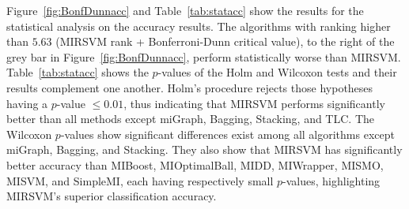 \documentclass[reqno]{vcuthesis}
\numberwithin{equation}{chapter}
\begin{document}
Figure~\ref{fig:BonfDunnacc} and Table~\ref{tab:statacc} show the results for the statistical analysis on the accuracy results. The algorithms with ranking higher than $5.63$ (MIRSVM rank + Bonferroni-Dunn critical value), to the right of the grey bar in Figure~\ref{fig:BonfDunnacc}, perform statistically worse than MIRSVM. Table~\ref{tab:statacc} shows the $p$-values of the Holm and Wilcoxon tests and their results complement one another. Holm's procedure rejects those hypotheses having a $p$-value $\leq 0.01$, thus indicating that MIRSVM performs significantly better than all methods except miGraph, Bagging, Stacking, and TLC. The Wilcoxon $p$-values show significant differences exist among all algorithms except miGraph, Bagging, and Stacking. They also show that MIRSVM has significantly better accuracy than MIBoost, MIOptimalBall, MIDD, MIWrapper, MISMO, MISVM, and SimpleMI, each having respectively small $p$-values, highlighting MIRSVM's superior classification accuracy. 
\end{document}
